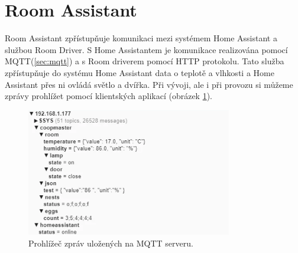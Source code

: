 \section{Room Assistant}\label{sec:room-assistant}

Room Assistant zpřístupňuje komunikaci mezi systémem Home Assistant a službou Room Driver.\newline
S Home Assistantem je komunikace realizována pomocí MQTT(\ref{sec:mqtt}) a s Room driverem pomocí HTTP protokolu.
Tato služba zpřístupňuje do systému Home Assistant data o teplotě a vlhkosti a Home Assistant přes ni ovládá světlo a dvířka.
Při vývoji, ale i při provozu si můžeme zprávy prohlížet pomocí klientských aplikací (obrázek \ref{fig:homeassistant_input_data_mqtt}).

\begin{figure}[h]
    \centering
    \includegraphics[width=0.8\textwidth]{img/homeassistant_input_data_mqtt}
    \caption{Prohlížeč zpráv uložených na MQTT serveru.}
    \label{fig:homeassistant_input_data_mqtt}
\end{figure}


